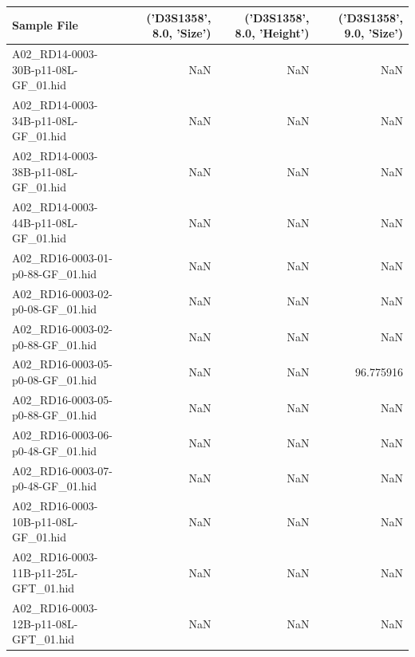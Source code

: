 \begin{landscape}
\begin{table}
\centering
\begin{tabular}{lrrr}
\toprule
                         Sample File &  ('D3S1358', 8.0, 'Size') &  ('D3S1358', 8.0, 'Height') &  ('D3S1358', 9.0, 'Size') \\
\midrule
 A02\_RD14-0003-30B-p11-08L-GF\_01.hid &                       NaN &                         NaN &                       NaN \\
 A02\_RD14-0003-34B-p11-08L-GF\_01.hid &                       NaN &                         NaN &                       NaN \\
 A02\_RD14-0003-38B-p11-08L-GF\_01.hid &                       NaN &                         NaN &                       NaN \\
 A02\_RD14-0003-44B-p11-08L-GF\_01.hid &                       NaN &                         NaN &                       NaN \\
    A02\_RD16-0003-01-p0-88-GF\_01.hid &                       NaN &                         NaN &                       NaN \\
    A02\_RD16-0003-02-p0-08-GF\_01.hid &                       NaN &                         NaN &                       NaN \\
    A02\_RD16-0003-02-p0-88-GF\_01.hid &                       NaN &                         NaN &                       NaN \\
    A02\_RD16-0003-05-p0-08-GF\_01.hid &                       NaN &                         NaN &                 96.775916 \\
    A02\_RD16-0003-05-p0-88-GF\_01.hid &                       NaN &                         NaN &                       NaN \\
    A02\_RD16-0003-06-p0-48-GF\_01.hid &                       NaN &                         NaN &                       NaN \\
    A02\_RD16-0003-07-p0-48-GF\_01.hid &                       NaN &                         NaN &                       NaN \\
 A02\_RD16-0003-10B-p11-08L-GF\_01.hid &                       NaN &                         NaN &                       NaN \\
A02\_RD16-0003-11B-p11-25L-GFT\_01.hid &                       NaN &                         NaN &                       NaN \\
A02\_RD16-0003-12B-p11-08L-GFT\_01.hid &                       NaN &                         NaN &                       NaN \\

\end{tabular}
\end{table}
\end{landscape}
